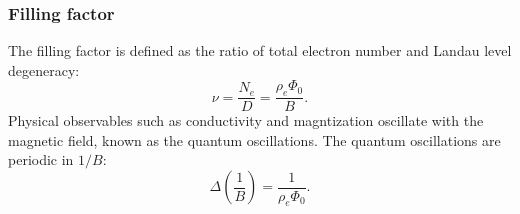 
\subsubsection{Filling factor}
The filling factor is defined as the ratio of total electron number and Landau level degeneracy:
\begin{equation}
\nu=\frac{N_e}{D}
=\frac{\rho_e\Phi_0}{B}.
\end{equation}
Physical observables such as conductivity and magntization oscillate with the magnetic field, known as the quantum oscillations. The quantum oscillations are periodic in $1/B$:
\begin{equation}
\boxed{\Delta\left(\frac1B\right)
=\frac{1}{\rho_e\Phi_0}.}
\end{equation}


